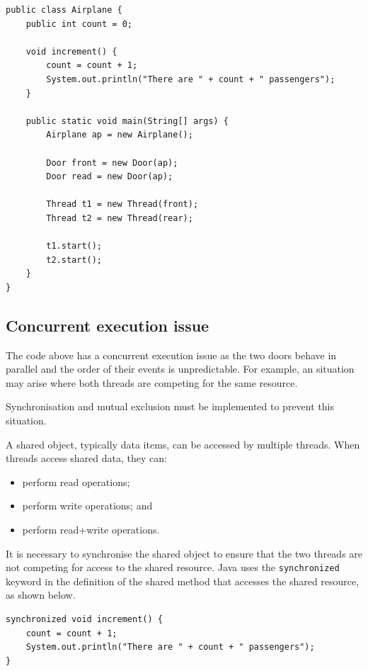 \documentclass[a4paper]{systems-software}
\begin{document}
\newpage

\begin{lstlisting}[title={Airplane class.}]
public class Airplane {
	public int count = 0;
	
	void increment() {
		count = count + 1;
		System.out.println("There are " + count + " passengers");
	}
	
	public static void main(String[] args) {
		Airplane ap = new Airplane();
		
		Door front = new Door(ap);
		Door read = new Door(ap);
		
		Thread t1 = new Thread(front);
		Thread t2 = new Thread(rear);
		
		t1.start();
		t2.start();
	}
}
\end{lstlisting}


\subsection*{Concurrent execution issue}

The code above has a concurrent execution issue as the two doors behave in parallel and the order of their events is unpredictable. For example, an situation may arise where both threads are competing for the same resource.

Synchronisation and mutual exclusion must be implemented to prevent this situation.

A shared object, typically data items, can be accessed by multiple threads. When threads access shared data, they can:
\begin{itemize}
	\item perform read operations;
	\item perform write operations; and
	\item perform read+write operations.
\end{itemize}

It is necessary to synchronise the shared object to ensure that the two threads are not competing for access to the shared resource. Java uses the \texttt{synchronized} keyword in the definition of the shared method that accesses the shared resource, as shown below.

\begin{lstlisting}[title={Revised increment() method in the Airplane class.}]
synchronized void increment() {
	count = count + 1;
	System.out.println("There are " + count + " passengers");
}
\end{lstlisting}


\newpage
\end{document}
